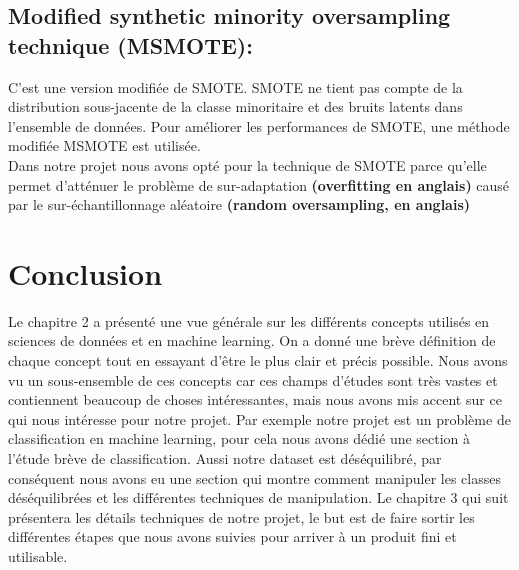 \documentclass[12pt, french]{report}
\begin{document}
\subsection{Modified synthetic minority oversampling technique (MSMOTE):}
C'est une version modifiée de SMOTE. SMOTE ne tient pas compte de la distribution sous-jacente de la classe minoritaire et des bruits latents dans l'ensemble de données. Pour améliorer les performances de SMOTE, une méthode modifiée MSMOTE est utilisée.\\

Dans notre projet nous avons opté pour la technique de SMOTE parce qu'elle permet d'atténuer le problème de sur-adaptation \textbf{(overfitting en anglais)} causé par le sur-échantillonnage aléatoire \textbf{(random oversampling, en anglais)} \\

\section{Conclusion}
Le chapitre 2 a présenté une vue générale sur les différents concepts utilisés en sciences de données et en machine learning. On a donné une brève définition de chaque concept tout en essayant d'être le plus clair et précis possible. Nous avons vu un sous-ensemble de ces concepts car ces champs d'études sont très vastes et contiennent beaucoup de choses intéressantes, mais nous avons mis accent sur ce qui nous intéresse pour notre projet. Par exemple notre projet est un problème de classification en machine learning, pour cela nous avons dédié une section à l'étude brève de classification. Aussi notre dataset est déséquilibré, par conséquent nous avons eu une section qui montre comment manipuler les classes déséquilibrées et les différentes techniques de manipulation. Le chapitre 3 qui suit présentera les détails techniques de notre projet, le but est de faire sortir les différentes étapes que nous avons suivies pour arriver à un produit fini et utilisable.

 




%
%
%
%
%
\end{document}
